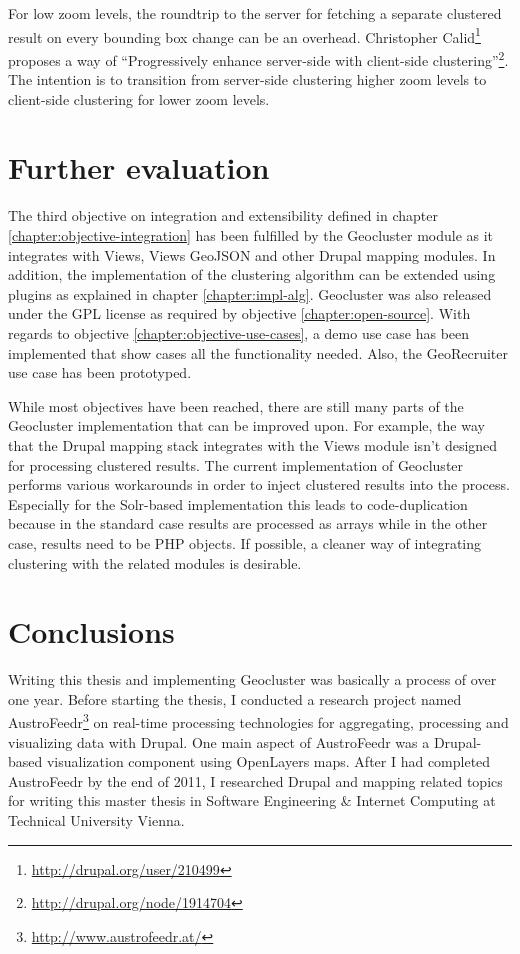 For low zoom levels, the roundtrip to the server for fetching a separate clustered result on every bounding box change can be an overhead. Christopher Calid\footnote{\url{http://drupal.org/user/210499}} proposes a way of ``Progressively enhance server-side with client-side clustering''\footnote{\url{http://drupal.org/node/1914704}}. The intention is to transition from server-side clustering higher zoom levels to client-side clustering for lower zoom levels.


\section{Further evaluation}

The third objective on integration and extensibility defined in chapter \ref{chapter:objective-integration} has been fulfilled by the Geocluster module as it integrates with Views, Views GeoJSON and other Drupal mapping modules. In addition, the implementation of the clustering algorithm can be extended using plugins as explained in chapter \ref{chapter:impl-alg}. Geocluster was also released under the GPL license as required by objective \ref{chapter:open-source}. With regards to objective \ref{chapter:objective-use-cases}, a demo use case has been implemented that show cases all the functionality needed. Also, the GeoRecruiter use case has been prototyped.
 
While most objectives have been reached, there are still many parts of the Geocluster implementation that can be improved upon. For example, the way that the Drupal mapping stack integrates with the Views module isn't designed for processing clustered results. The current implementation of Geocluster performs various workarounds in order to inject clustered results into the process. Especially for the Solr-based implementation this leads to code-duplication because in the standard case results are processed as arrays while in the other case, results need to be PHP objects. If possible, a cleaner way of integrating clustering with the related modules is desirable.   


\section{Conclusions}

Writing this thesis and implementing Geocluster was basically a process of over one year. Before starting the thesis, I conducted a research project named AustroFeedr\footnote{\url{http://www.austrofeedr.at/}} on real-time processing technologies for aggregating, processing and visualizing data with Drupal. One main aspect of AustroFeedr was a Drupal-based visualization component using OpenLayers maps. After I had completed AustroFeedr by the end of 2011, I researched Drupal and mapping related topics for writing this master thesis in Software Engineering \& Internet Computing at Technical University Vienna.


